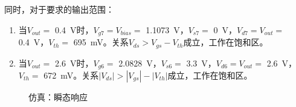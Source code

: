 \documentclass[UTF8]{ctexart}
\numberwithin{figure}{subsection}
\numberwithin{table}{subsection}
\numberwithin{equation}{subsection}
\begin{document}
同时，对于要求的输出范围：
\begin{enumerate}
    \item 当\(V_{out} = \) \SI{0.4}{\volt}时，\(V_{g7} = V_{bias} = \) \SI[]{1.1073}{\volt}，\(V_{s7}  = \) \SI[]{0}{\volt}，\(V_{d7} = V_{out} =\) \SI[]{0.4}{\volt}，\(V_{th}  = \) \SI[]{695}{\milli\volt}。关系\(V_{ds} > V_{gs} - V_{th}\)成立，工作在饱和区。
    \item 当\(V_{out} = \) \SI{2.6}{\volt}时，\(V_{g6} = \) \SI[]{2.0828}{\volt}，\(V_{s6}  = \) \SI[]{3.3}{\volt}，\(V_{d6} = V_{out} =\) \SI[]{2.6}{\volt}，\(V_{th}  = \) \SI[]{672}{\milli\volt}。关系\(|V_{ds}| > |V_{gs}| - |V_{th}|\)成立，工作在饱和区。
\end{enumerate}

\begin{figure}[H]
    \centering
    \caption{仿真：瞬态响应}
    \label{transfer simulation}
\end{figure}
\end{document}
